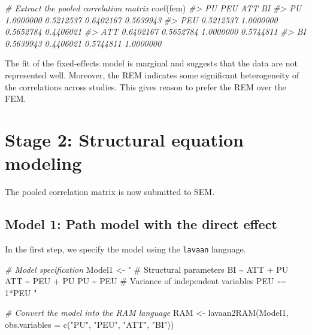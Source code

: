 \documentclass[
]{book}
\newenvironment{Shaded}{\begin{snugshade}}{\end{snugshade}}
\newcommand{\AttributeTok}[1]{\textcolor[rgb]{0.77,0.63,0.00}{#1}}
\newcommand{\CommentTok}[1]{\textcolor[rgb]{0.56,0.35,0.01}{\textit{#1}}}
\newcommand{\FunctionTok}[1]{\textcolor[rgb]{0.00,0.00,0.00}{#1}}
\newcommand{\NormalTok}[1]{#1}
\newcommand{\OtherTok}[1]{\textcolor[rgb]{0.56,0.35,0.01}{#1}}
\newcommand{\StringTok}[1]{\textcolor[rgb]{0.31,0.60,0.02}{#1}}
\begin{document}
\begin{Shaded}
\begin{Highlighting}[]
\CommentTok{\# Extract the pooled correlation matrix}
\FunctionTok{coef}\NormalTok{(fem)}
\CommentTok{\#\textgreater{}            PU       PEU       ATT        BI}
\CommentTok{\#\textgreater{} PU  1.0000000 0.5212537 0.6402167 0.5639943}
\CommentTok{\#\textgreater{} PEU 0.5212537 1.0000000 0.5652784 0.4406021}
\CommentTok{\#\textgreater{} ATT 0.6402167 0.5652784 1.0000000 0.5744811}
\CommentTok{\#\textgreater{} BI  0.5639943 0.4406021 0.5744811 1.0000000}
\end{Highlighting}
\end{Shaded}

The fit of the fixed-effects model is marginal and suggests that the data are not represented well. Moreover, the REM indicates some significant heterogeneity of the correlations across studies. This gives reason to prefer the REM over the FEM.

\hypertarget{stage-2-structural-equation-modeling}{%
\section{Stage 2: Structural equation modeling}\label{stage-2-structural-equation-modeling}}

The pooled correlation matrix is now submitted to SEM.

\hypertarget{model-1-path-model-with-the-direct-effect}{%
\subsection{Model 1: Path model with the direct effect}\label{model-1-path-model-with-the-direct-effect}}

In the first step, we specify the model using the \texttt{lavaan} language.

\begin{Shaded}
\begin{Highlighting}[]
\CommentTok{\# Model specification}
\NormalTok{Model1 }\OtherTok{\textless{}{-}} \StringTok{" \# Structural parameters}
\StringTok{            BI \textasciitilde{} ATT + PU}
\StringTok{            ATT \textasciitilde{} PEU + PU}
\StringTok{            PU \textasciitilde{} PEU}
\StringTok{            }
\StringTok{            \# Variance of independent variables}
\StringTok{            PEU \textasciitilde{}\textasciitilde{} 1*PEU}
\StringTok{"}

\CommentTok{\# Convert the model into the RAM language}
\NormalTok{RAM }\OtherTok{\textless{}{-}} \FunctionTok{lavaan2RAM}\NormalTok{(Model1,}
                  \AttributeTok{obs.variables =} \FunctionTok{c}\NormalTok{(}\StringTok{"PU"}\NormalTok{, }\StringTok{"PEU"}\NormalTok{, }\StringTok{"ATT"}\NormalTok{, }\StringTok{"BI"}\NormalTok{))}
\end{Highlighting}
\end{Shaded}
\end{document}
